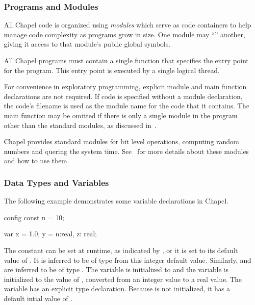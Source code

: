 \subsubsection{Programs and Modules}
\label{Programs_and_Modules}

All Chapel code is organized using \emph{modules} which serve as code
containers to help manage code complexity as programs grow in size.
One module may ``'' another, giving it access to that
module's public global symbols.  

All Chapel programs must contain a single function
 that specifies the entry point for the program.  
This entry point is executed by a single logical thread.

For convenience in exploratory programming,
explicit module and main function declarations are not required.  If code is specified 
without a module declaration, the code's
filename is used as the module name for the code that it contains.
The main function may be omitted if there is only a single module in
the program other than the standard modules, as discussed
in~.

Chapel provides standard modules for bit level operations, computing
random numbers and quering the system time.  See~
for more details about these modules and how to use them.

\subsubsection{Data Types and Variables}
\label{Data_Types_and_Variables}

The following example demonstrates some variable declarations in Chapel.
\begin{chapel}
config const n = 10;

var x = 1.0,
    y = n:real,
    z: real;
\end{chapel}

The constant  can be set at runtime, as indicated by , 
or it is set to its default value of .  It is inferred to be of 
type  from this integer default value.  Similarly,  and 
 are inferred to be of type .  The variable 
is initialized to  and the variable  is initialized to
the value of , converted from an integer value to a real value.
The variable  has an explicit type declaration.  
Because  is not initialized, it has a default intial value of .

